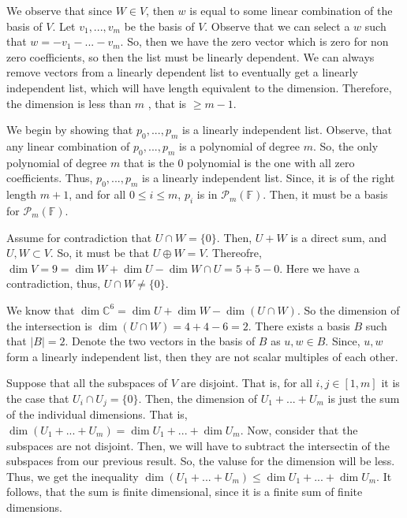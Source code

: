 \documentclass[10pt, twocolumn]{article}
\newcommand{\C}{\mathbb{C}}
\newcommand{\F}{\mathbb{F}}
\newcommand{\poly}[2]{\mathcal{P}_{#1}\left(#2\right)}
\begin{document}
\begin{q}[9]
	We observe that since $ W \in V $, then $ w $ is equal to some linear combination of the basis of $ V $. 
	Let $ v_1 ,..., v_m $ be the basis of $ V $.  
	Observe that we can select a $ w $ such that $ w = -v_1 - ...-v_m $. 
	So, then we have the zero vector which is zero for non zero coefficients, so then the list must be linearly dependent.
	We can always remove vectors from a linearly dependent list to eventually get a linearly independent list, 
	which will have length equivalent to the dimension. 
	Therefore, the dimension is less than $ m $ , that is $ \geq m -1 $. 
\end{q}
\begin{q}[10]
	We begin by showing that $ p_0,..., p_m $ is a linearly independent list. 	
	Observe, that any linear combination of $ p_0,..., p_m $ is a polynomial of degree $ m $. 
	So, the only polynomial of degree $ m $ that is the $ 0 $ polynomial is the one with all zero coefficients. 
	Thus, $ p_0,..., p_m $ is a linearly independent list. 
	Since, it is of the right length $ m + 1 $, and for all $ 0 \leq i \leq m $, $ p_i $ is in $ \poly{m}{\F} $.
	Then, it must be a basis for $ \poly{m}{\F} $.
\end{q}
\begin{q}[12]
	Assume for contradiction that $ U \cap W = \{0\}$.
	Then, $ U + W $ is a direct sum, and $ U, W \subset V $. 
	So, it must be that $ U \oplus W = V $. 
	Thereofre, $ \dim V = 9 = \dim W + \dim U - \dim W \cap U = 5 + 5 - 0 $. 
	Here we have a contradiction, thus, $ U \cap W \neq \{0\} $.
\end{q}
\begin{q}[13]
	We know that $ \dim \C^6 = \dim U + \dim W - \dim (U \cap W) $. 
	So the dimension of the intersection is $ \dim (U \cap W) = 4 + 4 - 6 = 2 $.
	There exists a basis $ B $ such that $ |B| = 2 $. 
	Denote the two vectors in the basis of $ B $ as $ u, w \in B $. 
	Since, $ u, w $ form a linearly independent list, then they are not scalar multiples of each other.
\end{q}
\begin{q}[14]
	Suppose that all the subspaces of $ V $ are disjoint.
	That is, for all $ i, j \in [1, m] $ it is the case that $ U_i \cap U_j = \{0\} $. 
	Then, the dimension of $ U_1 + ... + U_m $ is just the sum of the individual dimensions. 
	That is, $ \dim (U_1 + ... + U_m) =  \dim U_1 + ... + \dim U_m $. 
	Now, consider that the subspaces are not disjoint. 
	Then, we will have to subtract the intersectin of the subspaces from our previous result.
	So, the valuse for the dimension will be less. 
	Thus, we get the inequality
	$ \dim (U_1 + ... + U_m) \leq  \dim U_1 + ... + \dim U_m $.  
	It follows, that the sum is finite dimensional, since it is a finite sum of finite dimensions. 
\end{q}
\end{document}
